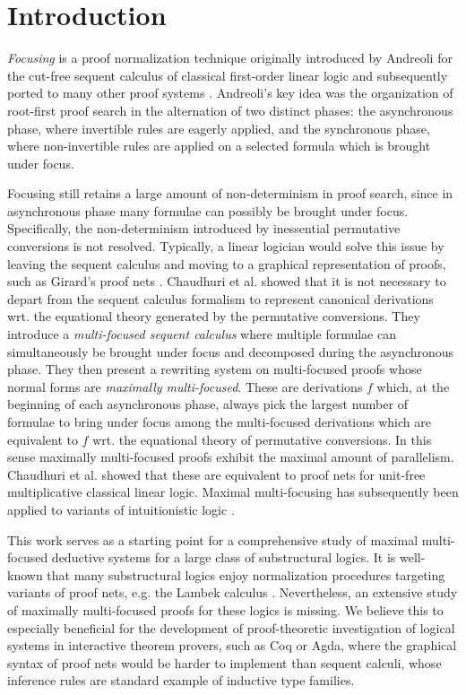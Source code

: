 \documentclass[runningheads]{llncs}
\begin{document}
\section{Introduction}\label{sec:intro}

\emph{Focusing} is a proof normalization technique originally introduced by Andreoli for the cut-free sequent calculus of classical first-order linear logic \cite{andreoli:logic:1992} and subsequently ported to many other proof systems \cite{LiangM09}. Andreoli's key idea was the organization of root-first proof search in the alternation of two distinct phases: the asynchronous phase, where invertible rules are eagerly applied, and the synchronous phase, where non-invertible rules are applied on a selected formula which is brought under focus.

Focusing still retains a large amount of non-determinism in proof search, since in asynchronous phase many formulae can possibly be brought under focus. Specifically, the non-determinism introduced by inessential permutative conversions is not resolved. Typically, a linear logician would solve this issue by leaving the sequent calculus and moving to a graphical representation of proofs, such as Girard's proof nets \cite{Girard87}. Chaudhuri et al. showed that it is not necessary to depart from the sequent calculus formalism to represent canonical derivations wrt. the equational theory generated by the permutative conversions. They introduce a \emph{multi-focused sequent calculus} where multiple formulae can simultaneously be brought under focus and decomposed during the asynchronous phase. They then present a rewriting system on multi-focused proofs whose normal forms are \emph{maximally multi-focused}. These are derivations $f$ which, at the beginning of each asynchronous phase, always pick the largest number of formulae to bring under focus among the multi-focused derivations which are equivalent to $f$ wrt. the equational theory of permutative conversions. In this sense maximally multi-focused proofs exhibit the maximal amount of parallelism. Chaudhuri et al. showed that these are equivalent to proof nets for unit-free multiplicative classical linear logic. Maximal multi-focusing has subsequently been applied to variants of intuitionistic logic \cite{Scherer15,PimentelNN16}.

This work serves as a starting point for a comprehensive study of maximal multi-focused deductive systems for a large class of substructural logics. It is well-known that many substructural logics enjoy normalization procedures targeting variants of proof nets, e.g. the Lambek calculus \cite{LR:pronlc}. Nevertheless, an extensive study of maximally multi-focused proofs for these logics is missing. We believe this to especially beneficial for the development of proof-theoretic investigation of logical systems in interactive theorem provers, such as Coq or Agda, where  the graphical syntax of proof nets would be harder to implement than sequent calculi, whose inference rules are standard example of inductive type families.
\end{document}
